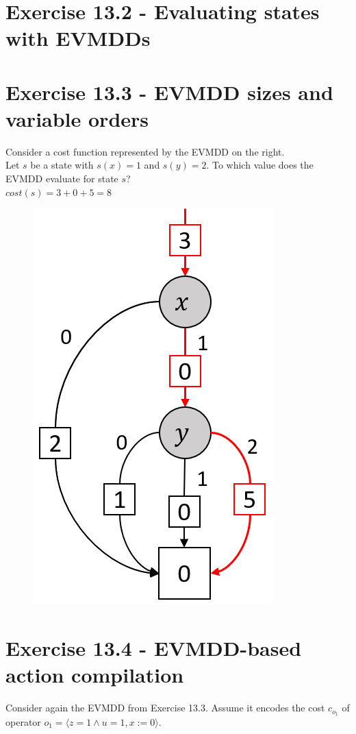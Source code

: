 \documentclass[11pt,a4paper]{article}
\begin{document}
\section*{Exercise 13.2 - Evaluating states with EVMDDs}


\section*{Exercise 13.3 - EVMDD sizes and variable orders}
Consider a cost function represented by the EVMDD on the right.\\
Let $s$ be a state with $s(x) = 1$ and $s(y) = 2$. To which value does the
EVMDD evaluate for state $s$?\\
$cost(s) = 3 + 0 + 5 = 8$
\begin{figure}[h!]
	\centering
	\includegraphics[scale=0.5]{13_3.png}
\end{figure}
\section*{Exercise 13.4 - EVMDD-based action compilation}
Consider again the EVMDD from Exercise 13.3. Assume it encodes the cost $c_{o_1}$ of operator $o_1 = \langle z = 1 \land u = 1, x := 0\rangle$.
\end{document}
